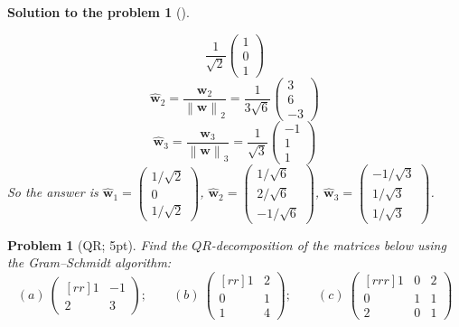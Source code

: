 \documentclass[12pt,a4]{article}
\newtheorem{problem}{Problem}
\newtheorem{solution}{Solution to the problem}
\newcommand{\bw}{{\mathbf w}}
\newcommand{\norm}[1]{\left\lVert#1\right\rVert}
\begin{document}
\begin{solution}[]
\begin{enumerate}[(a)]
\[\frac{1}{\sqrt 2}
\begin{pmatrix}
1 \\ 0 \\ 1
\end{pmatrix}
\]
\[
\hat \bw_2 = \frac{\bw_2}{\norm \bw_2} = 
\frac{1}{3\sqrt 6}
\begin{pmatrix} 
 3 \\ 6 \\ -3
\end{pmatrix}
\]
\[
\hat \bw_3 = \frac{\bw_3}{\norm \bw_3} = 
\frac{1}{\sqrt 3}
\begin{pmatrix} 
 -1 \\ 1 \\ 1
\end{pmatrix}
\]
So the answer is $\hat \bw_1 =
\begin{pmatrix} 1/\sqrt 2 \\ 0 \\ 1/\sqrt 2 \end{pmatrix}$, 
$\hat \bw_2 = 
\begin{pmatrix}  1/\sqrt 6 \\ 2/\sqrt 6 \\ -1/\sqrt 6 \end{pmatrix}$,
$\hat \bw_3 = 
\begin{pmatrix}  -1/\sqrt 3 \\ 1/\sqrt 3 \\ 1/\sqrt 3 \end{pmatrix}$.\\
\end{enumerate}
\end{solution}


\begin{problem}[QR; 5pt]\label{prb:QR}\rm
	Find the $QR$-decomposition of the matrices below using the Gram--Schmidt algorithm:
	\[
	(a)~\begin{pmatrix}[rr] 1 & -1 \\ 2 & 3  \end{pmatrix}; 
	\qquad
	(b)~\begin{pmatrix}[rr] 1 & 2 \\ 0 & 1 \\ 1 & 4 \end{pmatrix}; 
	\qquad
	(c)~\begin{pmatrix}[rrr] 1 & 0 & 2 \\ 0 & 1 & 1 \\ 2 & 0 & 1 \end{pmatrix}
	\]
\end{problem}	
\end{document}
